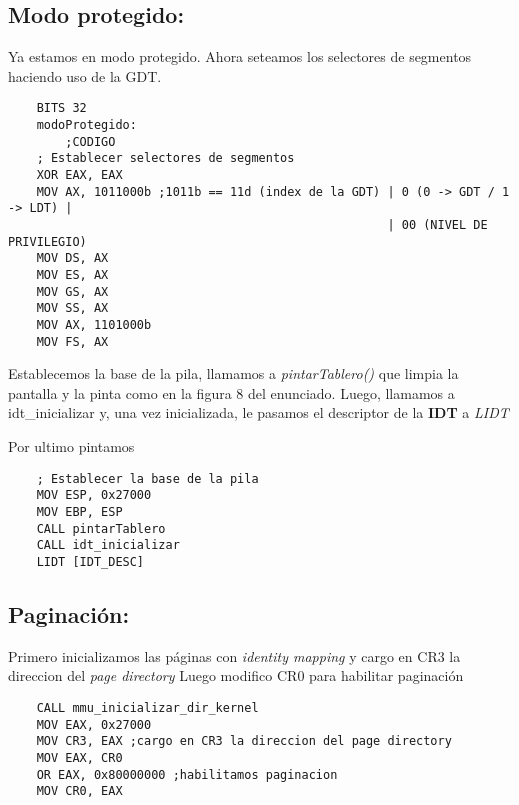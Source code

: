\subsection{Modo protegido:}
Ya estamos en modo protegido. Ahora seteamos los selectores de segmentos haciendo uso de la GDT.

\begin{codesnippet}
\begin{verbatim}
    BITS 32
    modoProtegido:
        ;CODIGO
    ; Establecer selectores de segmentos
    XOR EAX, EAX
    MOV AX, 1011000b ;1011b == 11d (index de la GDT) | 0 (0 -> GDT / 1 -> LDT) |
	                                                 | 00 (NIVEL DE PRIVILEGIO)
    MOV DS, AX
    MOV ES, AX
    MOV GS, AX
    MOV SS, AX
    MOV AX, 1101000b
    MOV FS, AX
\end{verbatim}
\end{codesnippet}

Establecemos la base de la pila, llamamos a \textit{pintarTablero()} que limpia la pantalla y la pinta como en la figura 8 del enunciado. 
Luego, llamamos a idt_inicializar y, una vez inicializada, 
le pasamos el descriptor de la \textbf{IDT} a \textit{LIDT}

Por ultimo pintamos 

\begin{codesnippet}
\begin{verbatim}
    ; Establecer la base de la pila
    MOV ESP, 0x27000
    MOV EBP, ESP
    CALL pintarTablero
    CALL idt_inicializar
    LIDT [IDT_DESC]
\end{verbatim}
\end{codesnippet}

\subsection{Paginaci\'on:}

Primero inicializamos las p\'aginas con \textit{identity mapping} y cargo en CR3 la direccion del \textit{page directory}
Luego modifico CR0 para habilitar paginaci\'on

\begin{codesnippet}
\begin{verbatim}
	CALL mmu_inicializar_dir_kernel
	MOV EAX, 0x27000
	MOV CR3, EAX ;cargo en CR3 la direccion del page directory
	MOV EAX, CR0
    OR EAX, 0x80000000 ;habilitamos paginacion
	MOV CR0, EAX
\end{verbatim}
\end{codesnippet}

